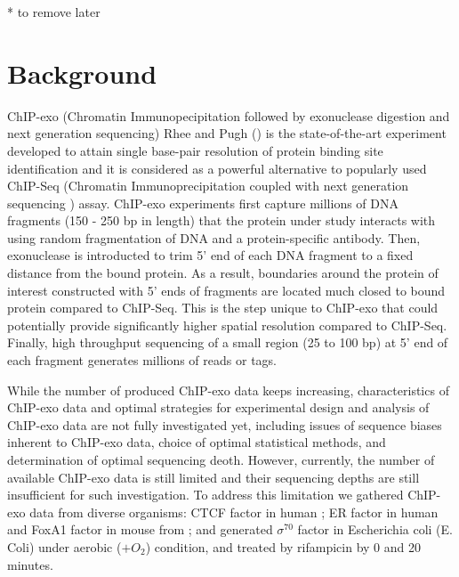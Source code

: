 \documentclass{bmcart}\usepackage[]{graphicx}\usepackage[]{color}
\begin{document}
\newpage

* to remove later

\tableofcontents


\newpage

\section{Background}
\label{sec:intro}

ChIP-exo (Chromatin Immunopecipitation followed by exonuclease
digestion and next generation sequencing) Rhee and Pugh (\cite{exo1})
is the state-of-the-art experiment developed to attain single
base-pair resolution of protein binding site identification and it is
considered as a powerful alternative to popularly used ChIP-Seq
(Chromatin Immunoprecipitation coupled with next generation sequencing
) assay. ChIP-exo experiments first capture millions of DNA fragments
(150 - 250 bp in length) that the protein under study interacts with
using random fragmentation of DNA and a protein-specific
antibody. Then, exonuclease is introducted to trim 5' end of each DNA
fragment to a fixed distance from the bound protein. As a result,
boundaries around the protein of interest constructed with 5' ends of
fragments are located much closed to bound protein compared to
ChIP-Seq. This is the step unique to ChIP-exo that could potentially
provide significantly higher spatial resolution compared to
ChIP-Seq. Finally, high throughput sequencing of a small region (25 to
100 bp) at 5' end of each fragment generates millions of reads or
tags.

While the number of produced ChIP-exo data keeps increasing,
characteristics of ChIP-exo data and optimal strategies for
experimental design and analysis of ChIP-exo data are not fully
investigated yet, including issues of sequence biases inherent to
ChIP-exo data, choice of optimal statistical methods, and
determination of optimal sequencing deoth. However, currently, the
number of available ChIP-exo data is still limited and their
sequencing depths are still insufficient for such investigation. To
address this limitation we gathered ChIP-exo data from diverse
organisms: CTCF factor in human \cite{exo1}; ER factor in human and
FoxA1 factor in mouse from \cite{exoillumina}; and generated
$\sigma^{70}$ factor in Escherichia coli (E. Coli) under aerobic ($ +
O_2$) condition, and treated by rifampicin by 0 and 20 minutes.
\end{document}
